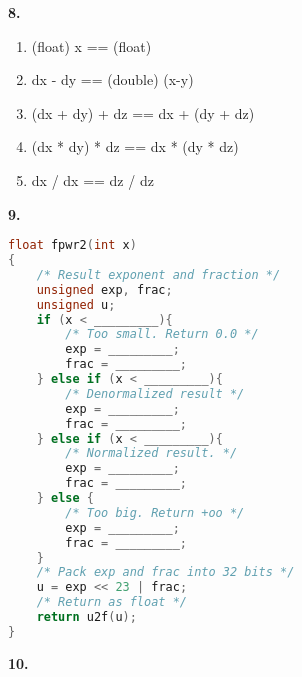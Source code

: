 \documentclass[11pt]{article} %
\begin{document}
\vspace{0.5in}
{\bf 8.}
\begin{enumerate}[label=\alph*)]
\item (float) x == (float)
\item dx - dy == (double) (x-y)
\item (dx + dy) + dz == dx + (dy + dz)
\item (dx * dy) * dz == dx * (dy * dz)
\item dx / dx == dz / dz
\end{enumerate}


\vspace{0.5in}
{\bf 9.}
\begin{lstlisting}[language=C]
float fpwr2(int x)
{
	/* Result exponent and fraction */
	unsigned exp, frac;
	unsigned u;
	if (x < _________){
		/* Too small. Return 0.0 */
		exp = _________;
		frac = _________;
	} else if (x < _________){
		/* Denormalized result */
		exp = _________;
		frac = _________;
	} else if (x < _________){
		/* Normalized result. */
		exp = _________;
		frac = _________;
	} else {
		/* Too big. Return +oo */
		exp = _________;
		frac = _________;
	}
	/* Pack exp and frac into 32 bits */
	u = exp << 23 | frac;
	/* Return as float */
	return u2f(u);
}
\end{lstlisting}

\vspace{0.5in}
{\bf 10.}
\end{document}

